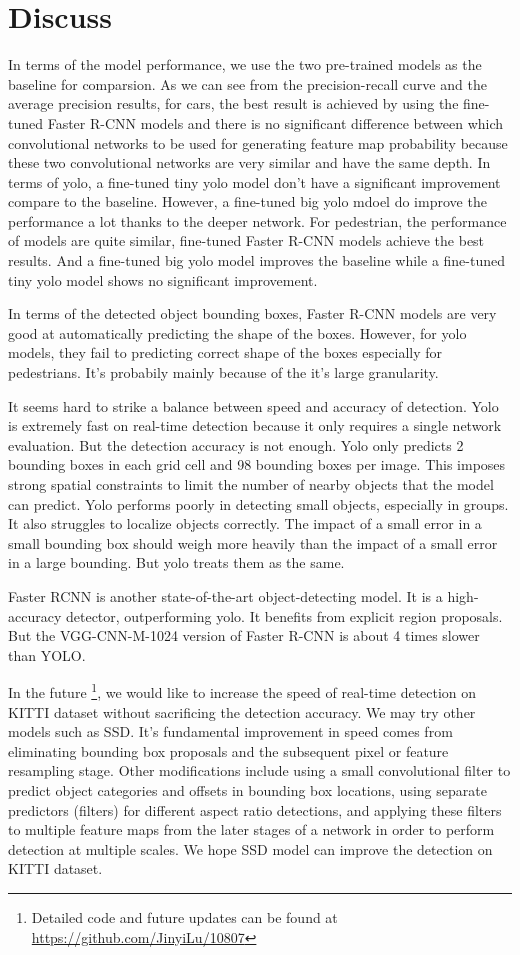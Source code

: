 \section{Discuss}
In terms of the model performance, we use the two pre-trained 
models as the baseline for comparsion.
As we can see from the precision-recall curve and the average precision results, for cars, the best result is achieved by 
using the fine-tuned Faster R-CNN models and there is 
no significant difference between which convolutional networks 
to be used for generating feature map probability because 
these two convolutional networks are very similar 
and have the same depth.
In terms of yolo, 
a fine-tuned tiny yolo model don't have a significant 
improvement compare to the baseline.
However, a fine-tuned big yolo mdoel do improve the performance 
a lot thanks to the deeper network.
For pedestrian, the performance of models are quite similar,
fine-tuned Faster R-CNN models achieve the best results. 
And a fine-tuned big yolo model improves the baseline while 
a fine-tuned tiny yolo model shows no significant improvement.

In terms of the detected object bounding boxes, 
Faster R-CNN models are very good at automatically predicting the 
shape of the boxes. However, for yolo models, 
they fail to predicting correct shape of the boxes 
especially for pedestrians. It's probabily mainly 
because of the it's large granularity.


It seems hard to strike a balance between speed and accuracy of detection. Yolo is extremely fast on real-time detection because it only requires a single network evaluation. But the detection accuracy is not enough. Yolo only predicts 2 bounding boxes in each grid cell and 98 bounding boxes per image. This imposes strong spatial constraints to limit the number of nearby objects that the model can predict. Yolo performs poorly in detecting small objects, especially in groups. It also struggles to localize objects correctly. The impact of a small error in a small bounding box should weigh more heavily than the impact of a small error in a large bounding. But yolo treats them as the same.

Faster RCNN is another state-of-the-art object-detecting model. It is a high-accuracy detector, outperforming yolo. It benefits from explicit region proposals. But the VGG-CNN-M-1024 version of Faster R-CNN is about 4 times slower than YOLO.

In the future \footnote{Detailed code and future updates can be found at \url{https://github.com/JinyiLu/10807}}, we would like to increase the speed of real-time detection on KITTI dataset without sacrificing the detection accuracy. We may try other models such as SSD. It's fundamental improvement in speed comes from eliminating bounding box proposals and the subsequent pixel or feature resampling stage. Other modifications include using a small convolutional filter to predict object categories and offsets in bounding box locations, using separate predictors (filters) for different aspect ratio detections, and applying these filters to multiple feature maps from the later stages of a network in order to perform detection at multiple scales. We hope SSD model can improve the detection on KITTI dataset.

